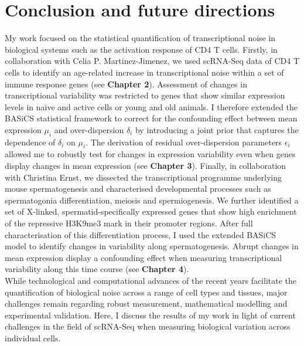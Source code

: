 
\graphicspath{{"../../Dropbox (Cambridge  University)/Figures_for_thesis/Discussion/"}}

\chapter{Conclusion and future directions}  

My work focused on the statistical quantification of transcriptional noise in biological systems such as the activation response of CD4\plus{} T cells. 
Firstly, in collaboration with Celia P. Martinez-Jimenez, we used scRNA-Seq data of CD4\plus{} T cells to identify an age-related increase in transcriptional noise within a set of immune response genes (see \textbf{Chapter 2}). 
Assessment of changes in transcriptional variability was restricted to genes that show similar expression levels in naive and active cells or young and old animals. 
I therefore extended the BASiCS statistical framework to correct for the confounding effect between mean expression $\mu_i$ and over-dispersion $\delta_i$ by introducing a joint prior that captures the dependence of $\delta_i$ on $\mu_i$. 
The derivation of residual over-dispersion parameters $\epsilon_i$ allowed me to robustly test for changes in expression variability even when genes display changes in mean expression (see \textbf{Chapter 3}). 
Finally, in collaboration with Christina Ernst, we dissected the transcriptional programme underlying mouse spermatogenesis and characterised developmental processes such as spermatogonia differentiation, meiosis and spermiogenesis.
 We further identified a set of X-linked, spermatid-specifically expressed genes that show high enrichment of the repressive H3K9me3 mark in their promoter regions. 
 After full characterisation of this differentiation process, I used the extended BASiCS model to identify changes in variability along spermatogenesis.   
 Abrupt changes in mean expression display a confounding effect when measuring transcriptional variability along this time course (see \textbf{Chapter 4}).  \\

While technological and computational advances of the recent years facilitate the quantification of biological noise across a range of cell types and tissues, major challenges remain regarding robust measurement, mathematical modelling and experimental validation. 
Here, I discuss the results of my work in light of current challenges in the field of scRNA-Seq when measuring biological variation across individual cells.

